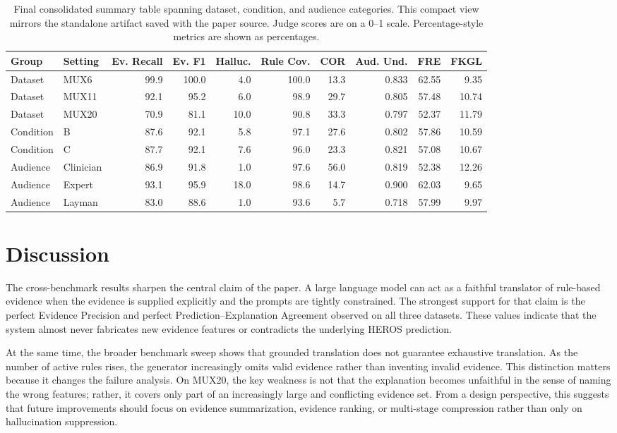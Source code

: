 \documentclass[sigconf,nonacm]{acmart}
\begin{document}
\begin{table}[t]
\caption{Final consolidated summary table spanning dataset, condition, and audience categories. This compact view mirrors the standalone artifact saved with the paper source. Judge scores are on a 0--1 scale. Percentage-style metrics are shown as percentages.}
\label{tab:final-summary}
\centering
\small
\begin{tabular}{llrrrrrrrr}
\toprule
\textbf{Group} & \textbf{Setting} & \textbf{Ev. Recall} & \textbf{Ev. F1} & \textbf{Halluc.} & \textbf{Rule Cov.} & \textbf{COR} & \textbf{Aud. Und.} & \textbf{FRE} & \textbf{FKGL} \\
\midrule
Dataset & MUX6 & 99.9 & 100.0 & 4.0 & 100.0 & 13.3 & 0.833 & 62.55 & 9.35 \\
Dataset & MUX11 & 92.1 & 95.2 & 6.0 & 98.9 & 29.7 & 0.805 & 57.48 & 10.74 \\
Dataset & MUX20 & 70.9 & 81.1 & 10.0 & 90.8 & 33.3 & 0.797 & 52.37 & 11.79 \\
\midrule
Condition & B & 87.6 & 92.1 & 5.8 & 97.1 & 27.6 & 0.802 & 57.86 & 10.59 \\
Condition & C & 87.7 & 92.1 & 7.6 & 96.0 & 23.3 & 0.821 & 57.08 & 10.67 \\
\midrule
Audience & Clinician & 86.9 & 91.8 & 1.0 & 97.6 & 56.0 & 0.819 & 52.38 & 12.26 \\
Audience & Expert & 93.1 & 95.9 & 18.0 & 98.6 & 14.7 & 0.900 & 62.03 & 9.65 \\
Audience & Layman & 83.0 & 88.6 & 1.0 & 93.6 & 5.7 & 0.718 & 57.99 & 9.97 \\
\bottomrule
\end{tabular}
\end{table}

\section{Discussion}
The cross-benchmark results sharpen the central claim of the paper. A large language model can act as a faithful translator of rule-based evidence when the evidence is supplied explicitly and the prompts are tightly constrained. The strongest support for that claim is the perfect Evidence Precision and perfect Prediction--Explanation Agreement observed on all three datasets. These values indicate that the system almost never fabricates new evidence features or contradicts the underlying HEROS prediction.

At the same time, the broader benchmark sweep shows that grounded translation does not guarantee exhaustive translation. As the number of active rules rises, the generator increasingly omits valid evidence rather than inventing invalid evidence. This distinction matters because it changes the failure analysis. On MUX20, the key weakness is not that the explanation becomes unfaithful in the sense of naming the wrong features; rather, it covers only part of an increasingly large and conflicting evidence set. From a design perspective, this suggests that future improvements should focus on evidence summarization, evidence ranking, or multi-stage compression rather than only on hallucination suppression.
\end{document}
